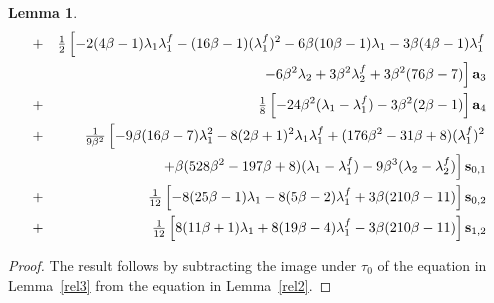 \documentclass[a4paper]{amsart}
\newtheorem{lemma}{Lemma}[section]
\newcommand{\lmu}{\lambda_1}
\newcommand{\lmf}{\lambda_1^f}
\newcommand{\lmd}{\lambda_2}
\newcommand{\lmdf}{\lambda_2^f}
\newcommand{\bt}{\beta}
\newcommand{\ba}{{\bf a}}
\newcommand{\bs}{{\bf s}}
\begin{document}
\begin{lemma}
\begin{eqnarray*}
&+& \tfrac{1}{2}\left [
-2(4\bt-1)\lmu\lmf-(16\bt-1)(\lmf)^2-6\bt(10\bt-1)\lmu-3\bt(4\bt-1)\lmf \right . \\
&& \left . -6\bt^2\lmd+3\bt^2\lmdf+3\bt^2(76\bt-7) \right ] \ba_{3} \\
&+& \tfrac{1}{8}\left [
-24\bt^2(\lmu-\lmf)-3\bt^2(2\bt-1) \right ] \ba_{4} \\
&+&\tfrac{1}{9\bt^2} \left [
-9\bt(16\bt-7)\lmu^2-8(2\bt+1)^2\lmu\lmf+(176\bt^2-31\bt+8)(\lmf)^2 \right . \\
&&
\left . +\bt(528\bt^2-197\bt+8)(\lmu-\lmf)-9\bt^3(\lmd-\lmdf) \right ] \bs_{0,1} \\
&+&
\tfrac{1}{12}\left [-8(25\bt-1)\lmu-8(5\bt-2)\lmf+3\bt(210\bt-11) \right ] \bs_{0,2} \\
&+&
\tfrac{1}{12}\left [8(11\bt+1)\lmu+8(19\bt-4)\lmf-3\bt(210\bt-11) \right ] \bs_{1,2} 
\end{eqnarray*}
\end{lemma}
\begin{proof}
The result follows by subtracting the image under $\tau_0$ of the equation in Lemma~\ref{rel3} from the equation in Lemma~\ref{rel2}.
\end{proof}
\end{document}
